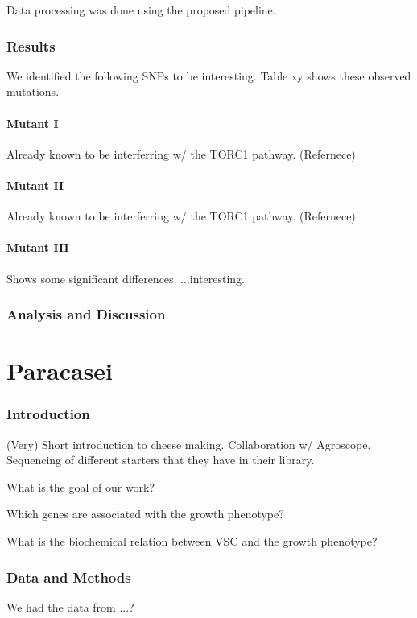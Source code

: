 \documentclass[]{article}
\begin{document}
Data processing was done using the proposed pipeline.

\section{Results}

We identified the following SNPs to be interesting. Table xy shows these observed mutations.



\subsection{Mutant I}
Already known to be interferring w/ the TORC1 pathway. (Refernece)

\subsection{Mutant II}
Already known to be interferring w/ the TORC1 pathway. (Refernece)

\subsection{Mutant III}
Shows some significant differences. ...interesting.

\section{Analysis and Discussion}

\pagebreak
\part{Paracasei}
\setcounter{section}{0}

\section{Introduction}
(Very) Short introduction to cheese making. Collaboration w/ Agroscope. Sequencing of different starters that they have in their library.

What is the goal of our work?

Which genes are associated with the growth phenotype?

What is the biochemical relation between VSC and the growth phenotype?


\section{Data and Methods}
We had the data from ...?
\end{document}
